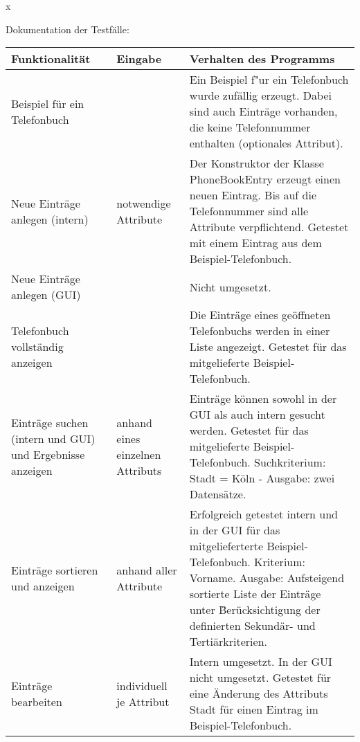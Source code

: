 \documentclass[a4paper]{article}
\begin{document}
\begin{exercise}{x}

Dokumentation der Testf\"alle:


\begin{center}

	\begin{tabular}{| p{2.5cm} | p{2.2cm} | p{10cm} |}
		\hline
		Funktionalit\"at & Eingabe & Verhalten des Programms\\ \hline \hline
		
		Beispiel f\"ur ein Telefonbuch &
		& Ein Beispiel f"ur ein Telefonbuch wurde zuf\"allig erzeugt. Dabei sind auch
		Eintr\"age vorhanden, die keine Telefonnummer enthalten (optionales Attribut). \\ \hline
		
		Neue Eintr\"age \newline anlegen (intern) & notwendige Attribute
		&  Der Konstruktor der Klasse PhoneBookEntry erzeugt einen neuen Eintrag.
		Bis auf die Telefonnummer sind alle Attribute verpflichtend. Getestet mit einem Eintrag aus
		dem Beispiel-Telefonbuch. \\ \hline
		
		Neue Eintr\"age \newline anlegen (GUI) &
		& Nicht umgesetzt. \\ \hline
		
		Telefonbuch \newline vollst\"andig \newline anzeigen & 
		& Die Eintr\"age eines ge\"offneten Telefonbuchs werden in einer
		Liste angezeigt. Getestet f\"ur das mitgelieferte Beispiel-Telefonbuch.\\ \hline
		
		Eintr\"age suchen (intern und GUI) und Ergebnisse anzeigen & anhand eines einzelnen Attributs
		& Eintr\"age k\"onnen sowohl in der GUI als auch intern gesucht werden.
		Getestet f\"ur das mitgelieferte Beispiel-Telefonbuch. Suchkriterium: Stadt = K\"oln -
		Ausgabe: zwei Datens\"atze.\\ \hline
		
		Eintr\"age sortieren und anzeigen & anhand aller Attribute
		& Erfolgreich getestet intern und in der GUI f\"ur das mitgelieferterte Beispiel-Telefonbuch.
		Kriterium: Vorname. Ausgabe: Aufsteigend sortierte Liste der Eintr\"age unter \"Ber\"ucksichtigung
		der definierten Sekund\"ar- und Terti\"arkriterien. \\ \hline
		
		Eintr\"age bearbeiten & individuell je Attribut
		& Intern umgesetzt. In der GUI nicht umgesetzt. Getestet f\"ur eine \"Anderung des Attributs
		Stadt f\"ur einen Eintrag im Beispiel-Telefonbuch.\\ \hline
		

\end{tabular}
\end{center}
\end{exercise}
\end{document}
